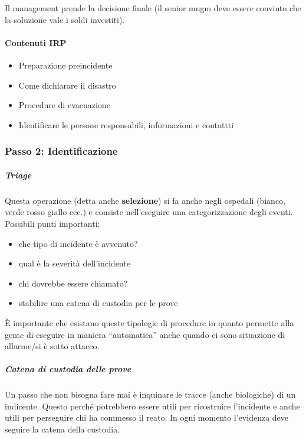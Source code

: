 Il management prende la decisione finale (il senior mngm deve essere convinto
che la soluzione vale i soldi investiti).

\paragraph*{Contenuti IRP}

\begin{itemize}
\item Preparazione preincidente
\item Come dichiarare il disastro
\item Procedure di evacuazione
\item Identificare le persone responsabili, informazioni e contattti
\end{itemize}

\subsubsection{Passo 2: Identificazione}
\subparagraph*{Triage} Questa operazione (detta anche \textbf{selezione}) si fa
anche negli ospedali (bianco, verde rosso giallo ecc.) e consiste nell'eseguire
una categorizzazione degli eventi. Possibili punti importanti:
\begin{itemize}
\item che tipo di incidente è avvenuto?
\item qual è la severità dell'incidente
\item chi dovrebbe essere chiamato?
\item stabilire una catena di custodia per le prove
\end{itemize}
È importante che esistano queste tipologie di procedure in quanto permette alla
gente di eseguire in maniera ``automatica'' anche quando ci sono situazione di
allarme/si è sotto attacco.

\subparagraph*{Catena di custodia delle prove} Un passo che non bisogna fare mai
è inquinare le tracce (anche biologiche) di un indicente. Questo perché
potrebbero essere utili per ricostruire l'incidente e anche utili per perseguire
chi ha commesso il reato.
In ogni momento l'evidenza deve seguire la catena della custodia. %


